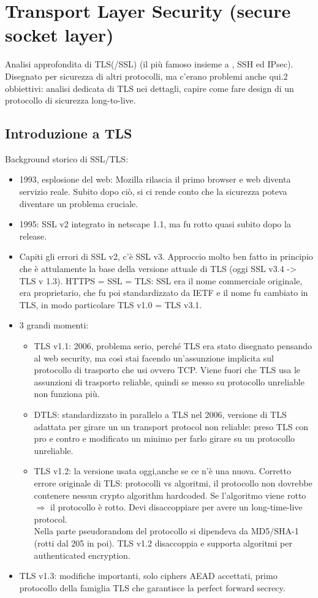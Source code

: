 \documentclass[16px]{article}
\begin{document}
\section{Transport Layer Security (secure socket layer)}
Analisi approfondita di TLS(/SSL) (il più famoso insieme a , SSH ed IPsec).\\ Disegnato per sicurezza di altri protocolli, ma c'erano problemi anche qui.2 obbiettivi: analisi dedicata di TLS nei dettagli, capire come fare design di un protocollo di sicurezza long-to-live.
\subsection{Introduzione a TLS}
Background storico di SSL/TLS:
\begin{itemize}
\item 1993, esplosione del web: Mozilla rilascia il primo browser e web diventa servizio reale. Subito dopo ciò, si ci rende conto che la sicurezza poteva diventare un problema cruciale.
\item 1995: SSL v2 integrato in netscape 1.1, ma fu rotto quasi subito dopo la release.
\item Capiti gli errori di SSL v2, c'è SSL v3. Approccio molto ben fatto in principio che è attulamente la base della versione attuale di TLS (oggi SSL v3.4 -> TLS v 1.3). HTTPS = SSL = TLS: SSL era il nome commerciale originale, era proprietario, che fu poi standardizzato da IETF e il nome fu cambiato in TLS, in modo particolare TLS v1.0 = TLS v3.1.
\item 3 grandi momenti: 
\begin{itemize}
\item TLS v1.1: 2006, problema serio, perché TLS era stato disegnato pensando al web security, ma così stai facendo un'assunzione implicita sul protocollo di trasporto che usi ovvero TCP. Viene fuori che TLS usa le assunzioni di trasporto reliable, quindi se messo su protocollo unreliable non funziona più.
\item DTLS: standardizzato in parallelo a TLS nel 2006, versione di TLS adattata per girare un un transport protocol non reliable: preso TLS con pro e contro e modificato un minimo per farlo girare su un protocollo unreliable.
\item TLS v1.2: la versione usata oggi,anche se ce n'è una nuova. Corretto errore originale di TLS: protocolli vs algoritmi, il protocollo non dovrebbe contenere nessun crypto algorithm hardcoded. Se l'algoritmo viene rotto $\Rightarrow$ il protocollo è rotto. Devi disaccoppiare per avere un long-time-live protocol.\\ Nella parte pseudorandom del protocollo si dipendeva da MD5/SHA-1 (rotti dal 205 in poi). TLS v1.2 disaccoppia e supporta algoritmi per authenticated encryption.
\end{itemize}
\item TLS v1.3: modifiche importanti, solo ciphers AEAD accettati, primo protocollo della famiglia TLS che garantisce la perfect forward secrecy.
\end{itemize}
\end{document}
